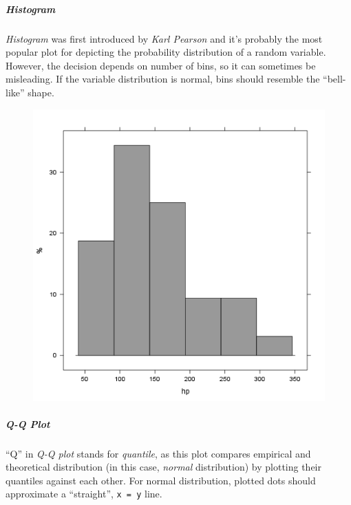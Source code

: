 \documentclass[]{article}
\makeatletter
\def\maxwidth{\ifdim\Gin@nat@width>\linewidth\linewidth
\else\Gin@nat@width\fi}
\let\Oldincludegraphics\includegraphics
\renewcommand{\includegraphics}[1]{\Oldincludegraphics[width=\maxwidth]{#1}}
\makeatother
\begin{document}
\subparagraph{Histogram}

\emph{Histogram} was first introduced by \emph{Karl Pearson} and it's
probably the most popular plot for depicting the probability
distribution of a random variable. However, the decision depends on
number of bins, so it can sometimes be misleading. If the variable
distribution is normal, bins should resemble the ``bell-like'' shape.

\begin{figure}[htbp]
\centering
\includegraphics{d90ec4a0af55fabeae7988710a062ce0.png}
\caption{}
\end{figure}

\subparagraph{Q-Q Plot}

``Q'' in \emph{Q-Q plot} stands for \emph{quantile}, as this plot
compares empirical and theoretical distribution (in this case,
\emph{normal} distribution) by plotting their quantiles against each
other. For normal distribution, plotted dots should approximate a
``straight'', \texttt{x = y} line.
\end{document}
